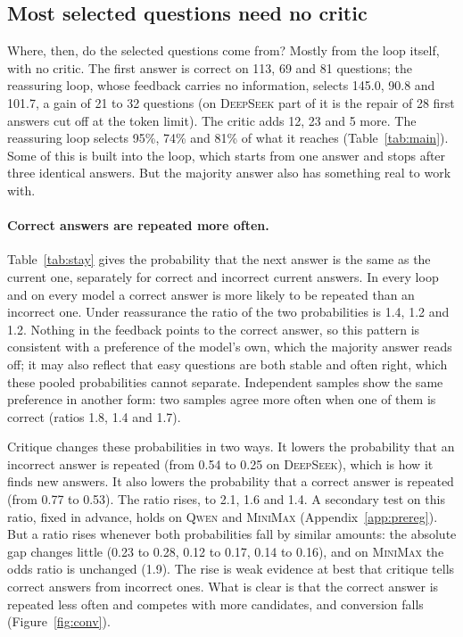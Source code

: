 \documentclass[11pt]{article}
\newcommand{\ds}{\textsc{DeepSeek}}
\newcommand{\qw}{\textsc{Qwen}}
\newcommand{\mm}{\textsc{MiniMax}}
\begin{document}
\subsection{Most selected questions need no critic}
\label{sec:mech}

Where, then, do the selected questions come from?
Mostly from the loop itself, with no critic.
The first answer is correct on 113, 69 and 81 questions; the reassuring loop, whose feedback carries no information, selects 145.0, 90.8 and 101.7, a gain of 21 to 32 questions (on \ds{} part of it is the repair of 28 first answers cut off at the token limit).
The critic adds 12, 23 and 5 more.
The reassuring loop selects 95\%, 74\% and 81\% of what it reaches (Table~\ref{tab:main}).
Some of this is built into the loop, which starts from one answer and stops after three identical answers.
But the majority answer also has something real to work with.

\paragraph{Correct answers are repeated more often.}
Table~\ref{tab:stay} gives the probability that the next answer is the same as the current one, separately for correct and incorrect current answers.
In every loop and on every model a correct answer is more likely to be repeated than an incorrect one.
Under reassurance the ratio of the two probabilities is 1.4, 1.2 and 1.2.
Nothing in the feedback points to the correct answer, so this pattern is consistent with a preference of the model's own, which the majority answer reads off; it may also reflect that easy questions are both stable and often right, which these pooled probabilities cannot separate.
Independent samples show the same preference in another form: two samples agree more often when one of them is correct (ratios 1.8, 1.4 and 1.7).

Critique changes these probabilities in two ways.
It lowers the probability that an incorrect answer is repeated (from 0.54 to 0.25 on \ds), which is how it finds new answers.
It also lowers the probability that a correct answer is repeated (from 0.77 to 0.53).
The ratio rises, to 2.1, 1.6 and 1.4.
A secondary test on this ratio, fixed in advance, holds on \qw{} and \mm{} (Appendix~\ref{app:prereg}).
But a ratio rises whenever both probabilities fall by similar amounts: the absolute gap changes little (0.23 to 0.28, 0.12 to 0.17, 0.14 to 0.16), and on \mm{} the odds ratio is unchanged (1.9).
The rise is weak evidence at best that critique tells correct answers from incorrect ones.
What is clear is that the correct answer is repeated less often and competes with more candidates, and conversion falls (Figure~\ref{fig:conv}).
\end{document}
